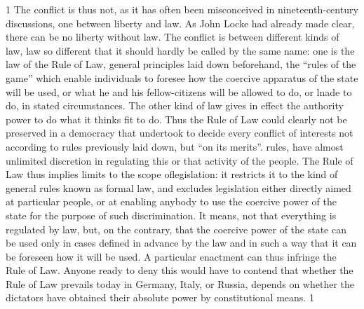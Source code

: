 \documentclass[11pt,openany]{book}
\begin{document}
1 The conflict is thus not, as it has often been misconceived in nineteenth-century discussions, one between liberty and law. As John Locke had already made clear, there can be no liberty without law. The conflict is between different kinds of law, law so different that it should hardly be called by the same name: one is the law of the Rule of Law, general principles laid down beforehand, the ``rules of the game'' which enable individuals to foresee how the coercive apparatus of the state will be used, or what he and his fellow-citizens will be allowed to do, or lnade to do, in stated circumstances. The other kind of law gives in effect the authority power to do what it thinks fit to do. Thus the Rule of Law could clearly not be preserved in a democracy that undertook to decide every conflict of interests not according to rules previously laid down, but ``on its merits''. rules, have almost unlimited discretion in regulating this or that activity of the people. The Rule of Law thus implies limits to the scope oflegislation: it restricts it to the kind of general rules known as formal law, and excludes legislation either directly aimed at particular people, or at enabling anybody to use the coercive power of the state for the purpose of such discrimination. It means, not that everything is regulated by law, but, on the contrary, that the coercive power of the state can be used only in cases defined in advance by the law and in such a way that it can be foreseen how it will be used. A particular enactment can thus infringe the Rule of Law. Anyone ready to deny this would have to contend that whether the Rule of Law prevails today in Germany, Italy, or Russia, depends on whether the dictators have obtained their absolute power by constitutional means. 1

\begin{center}\textasteriskcentered\hspace{0.9em}\textasteriskcentered\hspace{0.9em}\textasteriskcentered\end{center}

\begin{center}\textasteriskcentered\hspace{0.9em}\textasteriskcentered\hspace{0.9em}\textasteriskcentered\end{center}

\begin{center}\textasteriskcentered\hspace{0.9em}\textasteriskcentered\hspace{0.9em}\textasteriskcentered\end{center}
\end{document}
